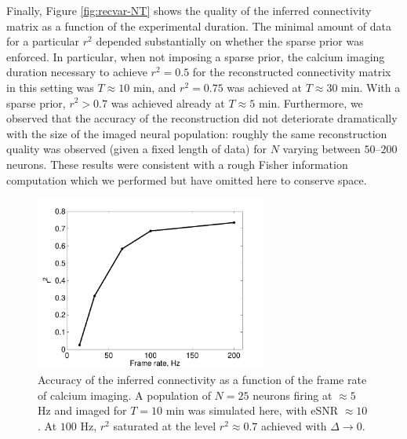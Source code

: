 \documentclass[aoas,preprint]{imsart}
\begin{document}
Finally, Figure \ref{fig:recvar-NT} shows the quality of the inferred
connectivity matrix as a function of the experimental duration. The
minimal amount of data for a particular $r^2$ depended substantially
on whether the sparse prior was enforced.  In particular, when not
imposing a sparse prior, the calcium imaging duration necessary to
achieve $r^2=0.5$ for the reconstructed connectivity matrix in this
setting was $T\approx 10$ min, and $r^2=0.75$ was achieved at
$T\approx 30$ min.  With a sparse prior, $r^2>0.7$ was achieved
already at $T\approx 5$ min. Furthermore, we observed that the
accuracy of the reconstruction did not deteriorate dramatically with
the size of the imaged neural population: roughly the same
reconstruction quality was observed (given a fixed length of data) for
$N$ varying between $50$--$200$ neurons.  These results were
consistent with a rough Fisher information computation which we
performed but have omitted here to conserve space.


\begin{figure}[t!]
\centering \includegraphics[width=3in]{../figs/FigureA5_recvar}
\caption{Accuracy of the inferred connectivity as a function of the
frame rate of calcium imaging.  A population of $N=25$ neurons firing
at $\approx 5$ Hz and imaged for $T=10$ min was simulated here, with
eSNR $\approx 10$.  At $100$ Hz, $r^2$ saturated at the level
$r^2\approx 0.7$ achieved with $\Delta \rightarrow 0$.}
\label{fig:recvar}
\end{figure}
\end{document}
